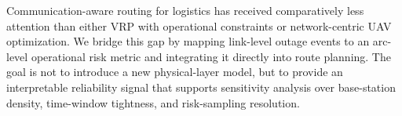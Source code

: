 Communication-aware routing for logistics has received comparatively less attention than either VRP with operational constraints or network-centric UAV optimization. We bridge this gap by mapping link-level outage events to an arc-level operational risk metric and integrating it directly into route planning. The goal is not to introduce a new physical-layer model, but to provide an interpretable reliability signal that supports sensitivity analysis over base-station density, time-window tightness, and risk-sampling resolution.
